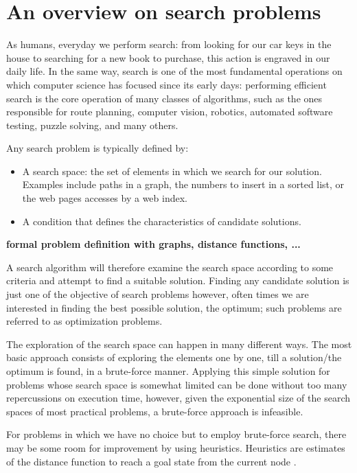 \newpage
\section{An overview on search problems}
As humans, everyday we perform search: from looking for our car keys in the house to searching for a new book to purchase, this action is engraved in our daily life.
In the same way, search is one of the most fundamental operations on which computer science has focused since its early days: performing efficient search is the core operation of many classes of algorithms, such as the ones responsible for route planning, computer vision, robotics, automated software testing, puzzle solving, and many others.


Any search problem is typically defined by: 
\begin{itemize}
    \item A search space: the set of elements in which we search for our solution. Examples include paths in a graph, the numbers to insert in a sorted list, or the web pages accesses by a web index.
    \item A condition that defines the characteristics of candidate solutions.
\end{itemize}

\textbf{formal problem definition with graphs, distance functions, ...}

A search algorithm will therefore examine the search space according to some criteria and attempt to find a suitable solution. Finding any candidate solution is just one of the objective of search problems however, often times we are interested in finding the best possible solution, the optimum; such problems are referred to as optimization problems.

The exploration of the search space can happen in many different ways. The most basic approach consists of exploring the elements one by one, till a solution/the optimum is found, in a brute-force manner. Applying this simple solution for problems whose search space is somewhat limited can be done without too many repercussions on execution time, however, given the exponential size of the search spaces of most practical problems, a brute-force approach is infeasible. 

For problems in which we have no choice but to employ brute-force search, there may be some room for improvement by using heuristics. Heuristics are estimates of the distance function to reach a goal state from the current node \cite{HeuristicSearch}.



